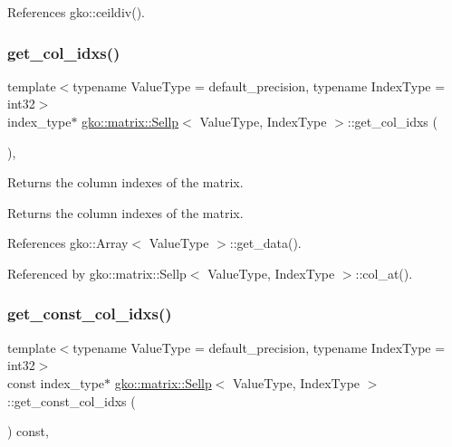References gko\+::ceildiv().

\mbox{\label{classgko_1_1matrix_1_1Sellp_abb770ef6fed094f707c96219a8b69d11}} 
\subsubsection{\texorpdfstring{get\+\_\+col\+\_\+idxs()}{get\_col\_idxs()}}
{\footnotesize\ttfamily template$<$typename Value\+Type = default\+\_\+precision, typename Index\+Type = int32$>$ \\
index\+\_\+type$\ast$ \hyperlink{classgko_1_1matrix_1_1Sellp}{gko\+::matrix\+::\+Sellp}$<$ Value\+Type, Index\+Type $>$\+::get\+\_\+col\+\_\+idxs (\begin{DoxyParamCaption}{ }\end{DoxyParamCaption})\hspace{0.3cm}{\ttfamily [inline]}, {\ttfamily [noexcept]}}



Returns the column indexes of the matrix. 

\begin{DoxyReturn}{Returns}
the column indexes of the matrix. 
\end{DoxyReturn}


References gko\+::\+Array$<$ Value\+Type $>$\+::get\+\_\+data().



Referenced by gko\+::matrix\+::\+Sellp$<$ Value\+Type, Index\+Type $>$\+::col\+\_\+at().

\mbox{\label{classgko_1_1matrix_1_1Sellp_a6b5417bd6f2c876925ce732c7526b562}} 
\subsubsection{\texorpdfstring{get\+\_\+const\+\_\+col\+\_\+idxs()}{get\_const\_col\_idxs()}}
{\footnotesize\ttfamily template$<$typename Value\+Type = default\+\_\+precision, typename Index\+Type = int32$>$ \\
const index\+\_\+type$\ast$ \hyperlink{classgko_1_1matrix_1_1Sellp}{gko\+::matrix\+::\+Sellp}$<$ Value\+Type, Index\+Type $>$\+::get\+\_\+const\+\_\+col\+\_\+idxs (\begin{DoxyParamCaption}{ }\end{DoxyParamCaption}) const\hspace{0.3cm}{\ttfamily [inline]}, {\ttfamily [noexcept]}}




